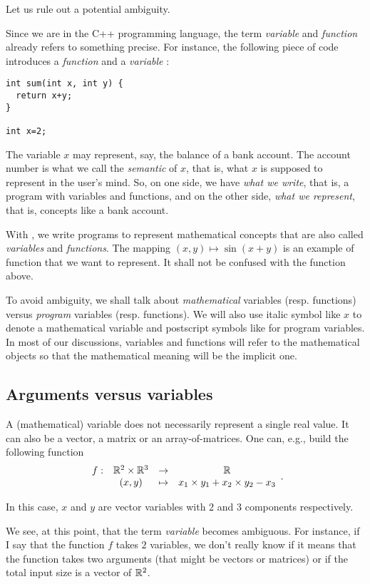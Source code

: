 Let us rule out a potential ambiguity.

Since we are in the C++ programming language, the term {\it variable} and
{\it function} already refers to something precise. For instance, the following
piece of code introduces a {\it function}  and a {\it variable} :
\begin{lstlisting}
int sum(int x, int y) { 
  return x+y;
}

int x=2;
\end{lstlisting}
The variable $x$ may represent, say, the balance of a bank account.
The account number is what we call the {\it semantic} of $x$, that is, what $x$ is supposed
to represent in the user's mind. So, on one side,
we have {\it what we write}, that is, a program with variables and functions,
 and on the other side, {\it what we represent}, that is, concepts 
like a bank account.

With \ibex, we write programs to represent mathematical concepts
that are also called {\it variables} and {\it functions}.
The mapping $(x,y)\mapsto \sin(x+y)$ is an example of function that
we want to represent. It shall not be confused with the function 
above.

To avoid ambiguity, we shall talk about {\it mathematical}
variables (resp. functions) versus {\it program} variables (resp. functions).
We will also use italic symbol like $x$ to denote a mathematical variable
and postscript symbols like  for program variables.
In most of our discussions, variables and functions will refer
to the mathematical objects so that the mathematical meaning will be the implicit one. 

\subsection{Arguments versus variables}

A (mathematical) variable does not necessarily represent a single real value.
It can also be a vector, a matrix or an array-of-matrices.
One can, e.g., build the following function 
$$\begin{array}{cccc}
f: & \mathbb{R}^2\times\mathbb{R}^3 & \to & \mathbb{R}\\
   &  (x,y) & \mapsto & x_1\times y_1+x_2\times y_2 - x_3
\end{array}.$$

In this case, $x$ and $y$ are vector variables with 2 and 3 components respectively.

We see, at this point, that the term {\it variable} becomes ambiguous.
For instance, if I say that the function $f$ takes $2$ variables, we don't really know if
it means that the function takes two arguments (that might be vectors or matrices) or if
the total input size is a vector of $\mathbb{R}^2$.

